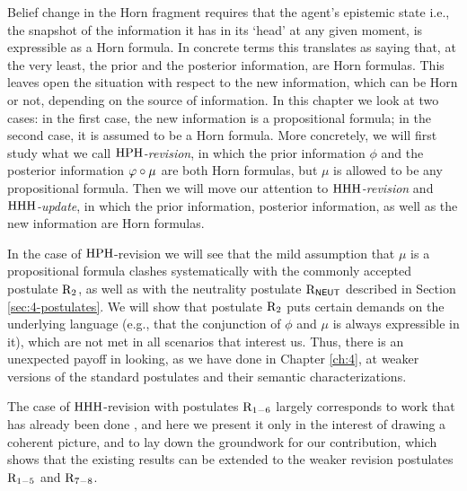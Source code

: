 
Belief change in the Horn fragment 
requires that the agent's epistemic state
i.e., the snapshot of the information it has in its `head'
at any given moment,
is expressible as a Horn formula.
In concrete terms this translates as saying that,
at the very least,
the prior and the posterior information,
are Horn formulas.
This leaves open the situation with respect to the new information,
which can be Horn or not, 
depending on the source of information.
In this chapter we look at two cases:
in the first case, the new information is a 
propositional formula;
in the second case, it is assumed to be a Horn formula.
More concretely,
we will first study what we call \emph{${\mathrm{HPH}}$-revision},
in which the prior information $\phi$ and the posterior
information $\varphi\circ\mu$ are both Horn formulas,
but $\mu$ is allowed to be any propositional formula.
Then we will move our attention to 
\emph{${\mathrm{HHH}}$-revision} and \emph{${\mathrm{HHH}}$-update},
in which the prior information, posterior information,
as well as the new information are Horn formulas.

In the case of ${\mathrm{HPH}}$-revision
we will see that the mild assumption
that $\mu$ is a propositional formula
clashes systematically with
the commonly accepted postulate $\mathrm{R}_{2}$,
as well as with the neutrality postulate $\mathrm{R}_{\mathsf{NEUT}}$
described in Section \ref{sec:4-postulates}.
We will show that postulate $\mathrm{R}_{2}$ puts certain demands on the underlying language
(e.g., that the conjunction of $\phi$ and $\mu$ is always expressible in it), 
which are not met in all scenarios that interest us.
Thus, there is an unexpected payoff in looking, as we have done in Chapter \ref{ch:4}, 
at weaker versions of the standard postulates 
and their semantic characterizations.

The case of ${\mathrm{HHH}}$-revision with postulates 
$\mathrm{R}_{1-6}$ largely corresponds to work 
that has already been done \cite{DelgrandeP15,DelgrandePW18},
and here we present it only in the interest of drawing a coherent picture,
and to lay down the groundwork for our contribution,
which shows that the existing results 
can be extended to the weaker revision 
postulates $\mathrm{R}_{1-5}$ and $\mathrm{R}_{7-8}$.

